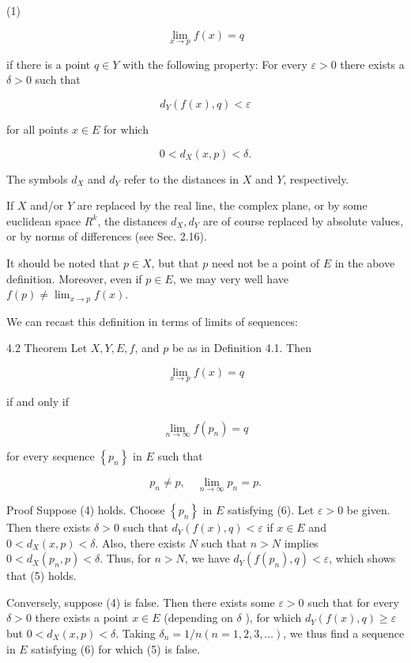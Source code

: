 \documentclass[10pt]{article}
\begin{document}
(1)

$$
\lim _{x \rightarrow p} f(x)=q
$$

if there is a point $q \in Y$ with the following property: For every $\varepsilon>0$ there exists a $\delta>0$ such that

$$
d_{Y}(f(x), q)<\varepsilon
$$

for all points $x \in E$ for which

$$
0<d_{X}(x, p)<\delta .
$$

The symbols $d_{X}$ and $d_{Y}$ refer to the distances in $X$ and $Y$, respectively.

If $X$ and/or $Y$ are replaced by the real line, the complex plane, or by some euclidean space $R^{k}$, the distances $d_{X}, d_{Y}$ are of course replaced by absolute values, or by norms of differences (see Sec. 2.16).

It should be noted that $p \in X$, but that $p$ need not be a point of $E$ in the above definition. Moreover, even if $p \in E$, we may very well have $f(p) \neq \lim _{x \rightarrow p} f(x)$.

We can recast this definition in terms of limits of sequences:

4.2 Theorem Let $X, Y, E, f$, and $p$ be as in Definition 4.1. Then

$$
\lim _{x \rightarrow p} f(x)=q
$$

if and only if

$$
\lim _{n \rightarrow \infty} f\left(p_{n}\right)=q
$$

for every sequence $\left\{p_{n}\right\}$ in $E$ such that

$$
p_{n} \neq p, \quad \lim _{n \rightarrow \infty} p_{n}=p .
$$

Proof Suppose (4) holds. Choose $\left\{p_{n}\right\}$ in $E$ satisfying (6). Let $\varepsilon>0$ be given. Then there exists $\delta>0$ such that $d_{Y}(f(x), q)<\varepsilon$ if $x \in E$ and $0<d_{X}(x, p)<\delta$. Also, there exists $N$ such that $n>N$ implies $0<d_{X}\left(p_{n}, p\right)<\delta$. Thus, for $n>N$, we have $d_{Y}\left(f\left(p_{n}\right), q\right)<\varepsilon$, which shows that (5) holds.

Conversely, suppose (4) is false. Then there exists some $\varepsilon>0$ such that for every $\delta>0$ there exists a point $x \in E$ (depending on $\delta$ ), for which $d_{Y}(f(x), q) \geq \varepsilon$ but $0<d_{X}(x, p)<\delta$. Taking $\delta_{n}=1 / n(n=1,2,3, \ldots)$, we thus find a sequence in $E$ satisfying (6) for which (5) is false.
\end{document}
